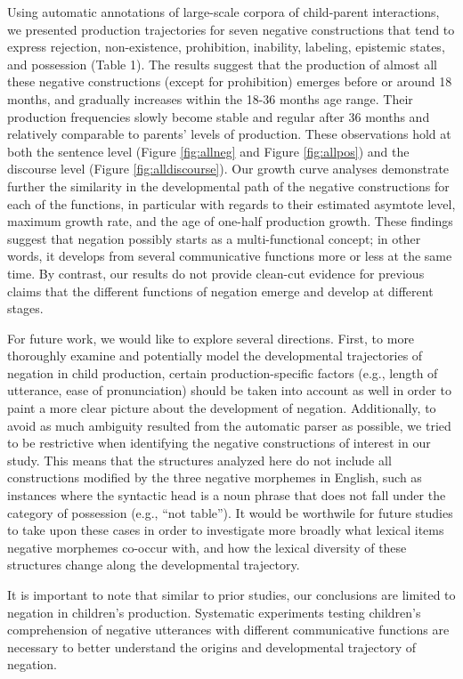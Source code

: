\documentclass[
  english,
  man,floatsintext]{apa6}
\begin{document}
Using automatic annotations of large-scale corpora of child-parent interactions, we presented production trajectories for seven negative constructions that tend to express rejection, non-existence, prohibition, inability, labeling, epistemic states, and possession (Table 1). The results suggest that the production of almost all these negative constructions (except for prohibition) emerges before or around 18 months, and gradually increases within the 18-36 months age range. Their production frequencies slowly become stable and regular after 36 months and relatively comparable to parents' levels of production. These observations hold at both the sentence level (Figure \ref{fig:allneg} and Figure \ref{fig:allpos}) and the discourse level (Figure \ref{fig:alldiscourse}). Our growth curve analyses demonstrate further the similarity in the developmental path of the negative constructions for each of the functions, in particular with regards to their estimated asymtote level, maximum growth rate, and the age of one-half production growth. These findings suggest that negation possibly starts as a multi-functional concept; in other words, it develops from several communicative functions more or less at the same time. By contrast, our results do not provide clean-cut evidence for previous claims that the different functions of negation emerge and develop at different stages.

For future work, we would like to explore several directions. First, to more thoroughly examine and potentially model the developmental trajectories of negation in child production, certain production-specific factors (e.g., length of utterance, ease of pronunciation) should be taken into account as well in order to paint a more clear picture about the development of negation. Additionally, to avoid as much ambiguity resulted from the automatic parser as possible, we tried to be restrictive when identifying the negative constructions of interest in our study. This means that the structures analyzed here do not include all constructions modified by the three negative morphemes in English, such as instances where the syntactic head is a noun phrase that does not fall under the category of possession (e.g., ``not table''). It would be worthwile for future studies to take upon these cases in order to investigate more broadly what lexical items negative morphemes co-occur with, and how the lexical diversity of these structures change along the developmental trajectory.

It is important to note that similar to prior studies, our conclusions are limited to negation in children's production. Systematic experiments testing children's comprehension of negative utterances with different communicative functions are necessary to better understand the origins and developmental trajectory of negation.
\end{document}
